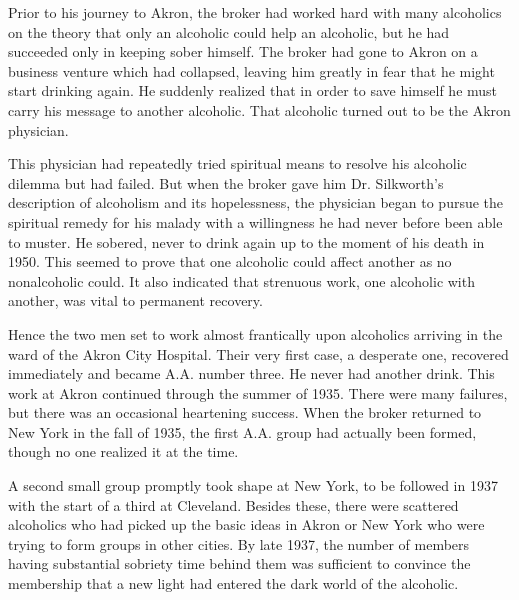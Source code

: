 Prior to his journey to Akron, the broker had worked hard with many alcoholics on the theory that only an alcoholic could help an alcoholic, but he had succeeded only in keeping sober himself. 
The broker had gone to Akron on a business venture which had collapsed, leaving him greatly in fear that he might start drinking again. 
He suddenly realized that in order to save himself he must carry his message to another alcoholic. 
That alcoholic turned out to be the Akron physician.

This physician had repeatedly tried spiritual means to resolve his alcoholic dilemma but had failed. 
But when the broker gave him Dr. Silkworth’s description of alcoholism and its hopelessness, the physician began to pursue the spiritual remedy for his malady with a willingness he had never before been able to muster.
He sobered, never to drink again up to the moment of his death in 1950. 
This seemed to prove that one alcoholic could affect another as no nonalcoholic
could.
It also indicated that strenuous work, one alcoholic with another, was vital to permanent recovery.

Hence the two men set to work almost frantically upon alcoholics arriving in the ward of the Akron City Hospital. 
Their very first case, a desperate one, recovered immediately and became A.A. number three. 
He never had another drink. 
This work at Akron continued through the summer of 1935. 
There were many failures, but there was an occasional heartening success. 
When the broker returned to New York in the fall of 1935, the ﬁrst A.A. group had actually been formed, though no one realized it at the time.

A second small group promptly took shape at New York, to be followed in 1937 with the start of a third at Cleveland. 
Besides these, there were scattered alcoholics who had picked up the basic ideas in Akron or New York who were trying to form groups in other cities. 
By late 1937, the number of members having substantial sobriety time behind them was sufficient to convince the membership that a new light had entered the dark world of the alcoholic.

